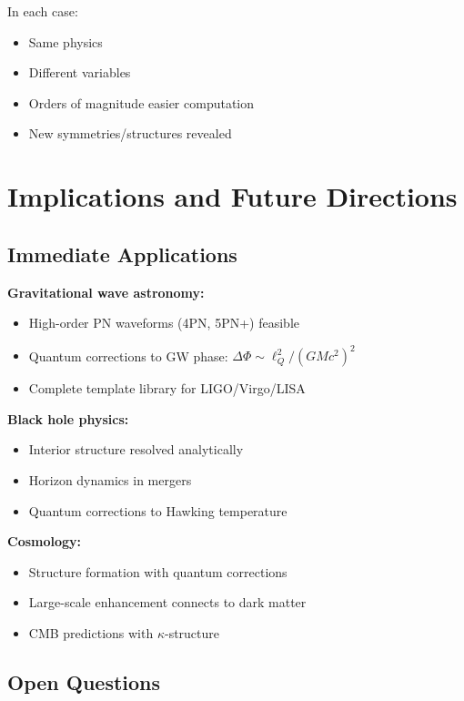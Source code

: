 \documentclass[11pt,a4paper]{article}
\theoremstyle{definition}
\theoremstyle{remark}
\begin{document}
	In each case:
	\begin{itemize}
		\item Same physics
		\item Different variables
		\item Orders of magnitude easier computation
		\item New symmetries/structures revealed
	\end{itemize}
	
	\section{Implications and Future Directions}
	
	\subsection{Immediate Applications}
	
	\textbf{Gravitational wave astronomy:}
	\begin{itemize}
		\item High-order PN waveforms (4PN, 5PN+) feasible
		\item Quantum corrections to GW phase: $\Delta\Phi \sim \ell_Q^2/(GMc^2)^2$
		\item Complete template library for LIGO/Virgo/LISA
	\end{itemize}
	
	\textbf{Black hole physics:}
	\begin{itemize}
		\item Interior structure resolved analytically
		\item Horizon dynamics in mergers
		\item Quantum corrections to Hawking temperature
	\end{itemize}
	
	\textbf{Cosmology:}
	\begin{itemize}
		\item Structure formation with quantum corrections
		\item Large-scale enhancement connects to dark matter
		\item CMB predictions with $\kappa$-structure
	\end{itemize}
	
	\subsection{Open Questions}
	
\end{document}

